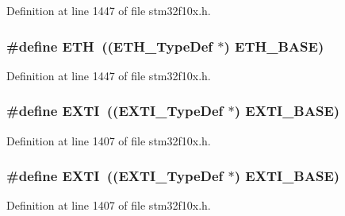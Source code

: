 Definition at line 1447 of file stm32f10x.\+h.

\subsubsection[{\texorpdfstring{E\+TH}{ETH}}]{\setlength{\rightskip}{0pt plus 5cm}\#define E\+TH~(({\bf E\+T\+H\+\_\+\+Type\+Def} $\ast$) {\bf E\+T\+H\+\_\+\+B\+A\+SE})}\hypertarget{group___peripheral__declaration_ga3a3f60de4318afbd0b3318e7a416aadc}{}\label{group___peripheral__declaration_ga3a3f60de4318afbd0b3318e7a416aadc}


Definition at line 1447 of file stm32f10x.\+h.

\subsubsection[{\texorpdfstring{E\+X\+TI}{EXTI}}]{\setlength{\rightskip}{0pt plus 5cm}\#define E\+X\+TI~(({\bf E\+X\+T\+I\+\_\+\+Type\+Def} $\ast$) {\bf E\+X\+T\+I\+\_\+\+B\+A\+SE})}\hypertarget{group___peripheral__declaration_ga9189e770cd9b63dadd36683eb9843cac}{}\label{group___peripheral__declaration_ga9189e770cd9b63dadd36683eb9843cac}


Definition at line 1407 of file stm32f10x.\+h.

\subsubsection[{\texorpdfstring{E\+X\+TI}{EXTI}}]{\setlength{\rightskip}{0pt plus 5cm}\#define E\+X\+TI~(({\bf E\+X\+T\+I\+\_\+\+Type\+Def} $\ast$) {\bf E\+X\+T\+I\+\_\+\+B\+A\+SE})}\hypertarget{group___peripheral__declaration_ga9189e770cd9b63dadd36683eb9843cac}{}\label{group___peripheral__declaration_ga9189e770cd9b63dadd36683eb9843cac}


Definition at line 1407 of file stm32f10x.\+h.

